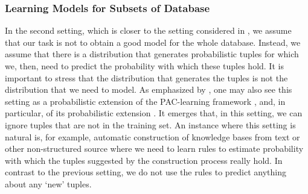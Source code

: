 \documentclass[akbc,twoside,11pt]{article}
\newcounter{example}
\begin{document}



\subsubsection{Learning Models for Subsets of Database}

In the second setting, which is closer to the setting considered in \citet{DBLP:conf/ijcai/RaedtDTBV15}, we assume that our task is not to obtain a good model for the whole database. Instead, we assume that there is a distribution that generates probabilistic tuples for which we, then, need to predict the probability with which these tuples hold. It is important to stress that the distribution that generates the tuples is not the distribution that we need to model. As emphasized by \citet{DBLP:conf/ijcai/RaedtDTBV15}, one may also see this setting as a probabilistic extension of the PAC-learning framework \cite{valiant1984theory}, and, in particular, of its probabilistic extension \cite{kearns1994efficient}. It emerges that, in this setting, we can ignore tuples that are not in the training set.
An instance where this setting is natural is, for example, automatic construction of knowledge bases from text or other non-structured source where we need to learn rules to estimate probability with which the tuples suggested by the construction process really hold. In contrast to the previous setting, we do not use the rules to predict anything about any `new' tuples. 
\end{document}
